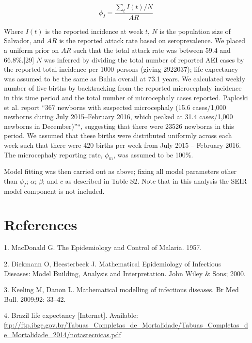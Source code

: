 \documentclass[10pt,letterpaper]{article}
\begin{document}
\begin{equation}
\phi_I = \frac{\sum_t I(t)/N}{AR}
\end{equation}

Where \(I(t)\) is the reported incidence at week \(t\), \(N\) is the
population size of Salvador, and \(AR\) is the reported attack rate
based on seroprevalence. We placed a uniform prior on \(AR\) such that
the total attack rate was between 59.4 and 66.8\%.{[}29{]} \(N\) was
inferred by dividing the total number of reported AEI cases by the
reported total incidence per 1000 persons (giving 2922037); life
expectancy was assumed to be the same as Bahia overall at 73.1 years. We
calculated weekly number of live births by backtracking from the
reported microcephaly incidence in this time period and the total number
of microcephaly cases reported. Paploski et al. report ``367 newborns
with suspected microcephaly (15.6 cases/1,000 newborns during July
2015--February 2016, which peaked at 31.4 cases/1,000 newborns in
December)''``, suggesting that there were 23526 newborns in this period.
We assumed that these births were distributed uniformly across each week
such that there were 420 births per week from July 2015 -- February
2016. The microcephaly reporting rate, \(\phi_m\), was assumed to be
100\%.

Model fitting was then carried out as above; fixing all model parameters
other than \(\phi_I\); \(\alpha\); \(\beta\); and \(c\) as described in
Table S2. Note that in this analysis the SEIR model component is not
included.

\section*{References}\label{references}

\hypertarget{refs}{}
\hypertarget{ref-MacDonald1957}{}
1. MacDonald G. The Epidemiology and Control of Malaria. 1957.

\hypertarget{ref-Diekmann2000}{}
2. Diekmann O, Heesterbeek J. Mathematical Epidemiology of Infectious
Diseases: Model Building, Analysis and Interpretation. John Wiley \&
Sons; 2000.

\hypertarget{ref-Keeling2009}{}
3. Keeling M, Danon L. Mathematical modelling of infectious diseases. Br
Med Bull. 2009;92: 33--42.

\hypertarget{ref-BahiaLifeExpectancy}{}
4. Brazil life expectancy {[}Internet{]}. Available:
\url{ftp://ftp.ibge.gov.br/Tabuas_Completas_de_Mortalidade/Tabuas_Completas_de_Mortalidade_2014/notastecnicas.pdf}
\end{document}
